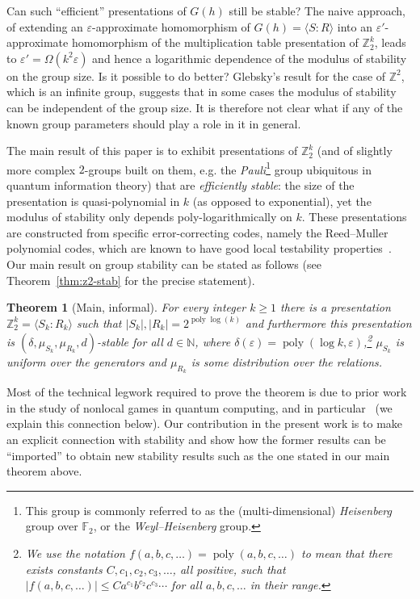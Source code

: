 \documentclass[11pt]{article}
\newtheorem{theorem*}{Theorem}
\theoremstyle{definition}
\newcommand{\field}{\mathbb{F}_2}
\newcommand{\N}{\ensuremath{\mathbb{N}}}
\newcommand{\Z}{\ensuremath{\mathbb{Z}}}
\DeclareMathOperator{\poly}{poly}
\newcommand{\eps}{\varepsilon}
\begin{document}
Can such ``efficient'' presentations of $G(h)$ still be stable? The naive approach, of extending an $\eps$-approximate homomorphism of $G(h)=\langle S:R\rangle$ into an $\eps'$-approximate homomorphism of the multiplication table presentation of $\Z_2^k$, leads to $\eps'=\Omega(k^2\eps)$ and hence a logarithmic dependence of the modulus of stability on the group size. Is it possible to do better? Glebsky's result for the case of $\Z^2$, which is an infinite group, suggests that in some cases the modulus of stability can be independent of the group size. It is therefore not clear what if any of the known group parameters should play a role in it in general.  

The main result of this paper is to exhibit presentations of $\Z_2^k$ (and of slightly more complex $2$-groups built on them, e.g. the \emph{Pauli}\footnote{This group is commonly referred to as the (multi-dimensional) \emph{Heisenberg} group over $\field$, or  the \emph{Weyl--Heisenberg} group.} group ubiquitous in quantum information theory) that are \emph{efficiently stable}: the size of the presentation is quasi-polynomial in $k$ (as opposed to exponential), yet the modulus of stability only depends poly-logarithmically on $k$. These presentations are constructed from specific error-correcting codes, namely the Reed--Muller polynomial codes, which are known to have good local testability properties~\cite{babai1991non}. Our main result on group stability can be stated as follows (see Theorem~\ref{thm:z2-stab} for the precise statement).

\begin{theorem*}[Main, informal]\label{thm:main-inf}
For every integer $k\geq 1$ there is a presentation $\Z_2^k = \langle S_k:R_k\rangle$ such that $|S_k|,|R_k| = 2^{\poly\log(k)}$ and furthermore this presentation is $(\delta,\mu_{S_k},\mu_{R_k},d)$-stable for all $d \in \N$, where $\delta(\eps)=\poly(\log k,\eps)$,\footnote{We use the notation $f(a,b,c,\ldots)=\poly(a,b,c,\ldots)$ to mean that there exists constants $C,c_1,c_2,c_3,\ldots$, all positive, such that $|f(a,b,c,\ldots)|\leq C a^{c_1} b^{c_2} c^{c_3}\cdots$ for all $a,b,c,\ldots$ in their range.\label{ft:poly}} $\mu_{S_k}$ is uniform over the generators and $\mu_{R_k}$ is some distribution over the relations. 
\end{theorem*}

Most of the technical legwork required to prove the theorem is due to prior work in the study of nonlocal games in quantum computing, and in particular~\cite{ji2020quantum} (we explain this connection below). Our contribution in the present work is to make an explicit connection with stability and show how the former results can be ``imported'' to obtain new stability results such as the one stated in our main theorem above. 
\end{document}
